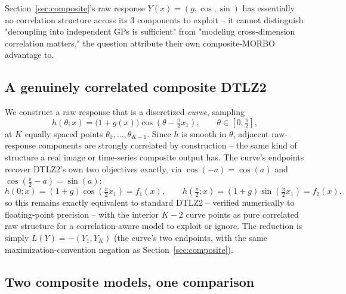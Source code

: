 \documentclass[11pt]{article}
\begin{document}
Section~\ref{sec:composite}'s raw response $Y(x) = (g, \cos, \sin)$ has
essentially no correlation structure across its 3 components to exploit --
it cannot distinguish "decoupling into independent GPs is sufficient" from
"modeling cross-dimension correlation matters," the question
\citet{maddox2021hogp} attribute their own composite-MORBO advantage to.

\subsection{A genuinely correlated composite DTLZ2}

We construct a raw response that is a discretized \emph{curve}, sampling
\begin{equation}
  h(\theta; x) = \big(1+g(x)\big)\cos\!\left(\theta - \tfrac{\pi}{2}x_1\right),
  \qquad \theta \in [0, \tfrac{\pi}{2}],
\end{equation}
at $K$ equally spaced points $\theta_0, \dots, \theta_{K-1}$. Since $h$ is
smooth in $\theta$, adjacent raw-response components are strongly
correlated by construction -- the same kind of structure a real image or
time-series composite output has. The curve's endpoints recover DTLZ2's own
two objectives exactly, via $\cos(-a) = \cos(a)$ and
$\cos(\tfrac{\pi}{2} - a) = \sin(a)$:
\begin{equation}
  h(0; x) = (1+g)\cos(\tfrac{\pi}{2}x_1) = f_1(x), \qquad
  h(\tfrac{\pi}{2}; x) = (1+g)\sin(\tfrac{\pi}{2}x_1) = f_2(x),
\end{equation}
so this remains exactly equivalent to standard DTLZ2 -- verified numerically
to floating-point precision -- with the interior $K-2$ curve points as pure
correlated raw structure for a correlation-aware model to exploit or ignore.
The reduction is simply $L(Y) = -(Y_1, Y_K)$ (the curve's two endpoints,
with the same maximization-convention negation as Section~\ref{sec:composite}).

\subsection{Two composite models, one comparison}
\end{document}
